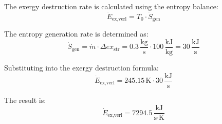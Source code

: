 The exergy destruction rate is calculated using the entropy balance:  
\[
\dot{E}_{\text{ex,verl}} = T_0 \cdot \dot{S}_{\text{gen}}
\]  

The entropy generation rate is determined as:  
\[
\dot{S}_{\text{gen}} = \dot{m} \cdot \Delta ex_{\text{str}} = 0.3 \, \frac{\text{kg}}{\text{s}} \cdot 100 \, \frac{\text{kJ}}{\text{kg}} = 30 \, \frac{\text{kJ}}{\text{s}}
\]  

Substituting into the exergy destruction formula:  
\[
\dot{E}_{\text{ex,verl}} = 245.15 \, \text{K} \cdot 30 \, \frac{\text{kJ}}{\text{s}}
\]  

The result is:  
\[
\dot{E}_{\text{ex,verl}} = 7294.5 \, \frac{\text{kJ}}{\text{s·K}}
\]